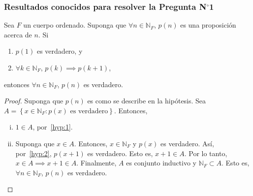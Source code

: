 \begin{frame}
  \frametitle{Resultados conocidos para resolver la Pregunta N$^{\circ}$1}

  \begin{theorem}
    Sea $F$ un \alert{cuerpo ordenado}.
    Suponga que $\forall n\in\mathbb{N}_{F}$, $p\left(n\right)$ es
    una proposición acerca de $n$.
    Si

    \begin{multicols}{2}
      \begin{enumerate}[(1)]
        \item\label{hyp:1}

        $p\left(1\right)$ es verdadero, y

        \item\label{hyp:2}

        $\forall k\in\mathbb{N}_{F}$,
        $p\left(k\right)\implies p\left(k+1\right)$,
      \end{enumerate}
    \end{multicols}

    entonces $\forall n\in\mathbb{N}_{F}$, $p\left(n\right)$ es
    verdadero.
  \end{theorem}

  \begin{proof}
    Suponga que $p\left(n\right)$ es como se describe en la
    hipótesis.
    Sea
    \begin{math}
      A=
      \left\{
      x\in\mathbb{N}_{F}:
      p\left(x\right)\text{ es verdadero}
      \right\}
    \end{math}.
    Entonces,
    \begin{enumerate}[(i)]
      \item

            $1\in A$, por~\eqref{hyp:1}.

      \item

            Suponga que $x\in A$. Entonces, $x\in\mathbb{N}_{F}$ y
            $p\left(x\right)$ es verdadero.
            Así, por~\eqref{hyp:2}, $p\left(x+1\right)$ es verdadero.
            Esto es, $x+1\in A$.
            Por lo tanto, $x\in A\implies x+1\in A$.
            Finalmente, $A$ es conjunto inductivo y
            $\mathbb{N}_{F}\subset A$.
            Esto es, $\forall n\in\mathbb{N}_{F}$, $p\left(n\right)$
            es verdadero.
    \end{enumerate}
  \end{proof}


\end{frame}
